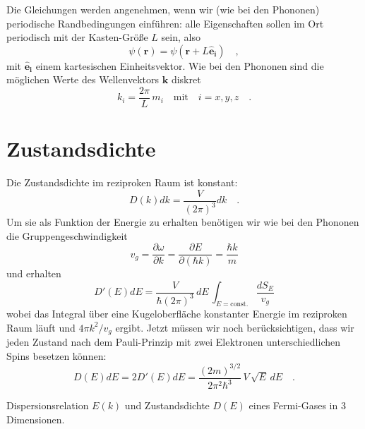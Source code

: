 Die Gleichungen werden angenehmen, wenn wir (wie bei den Phononen) periodische Randbedingungen einführen: alle Eigenschaften sollen im Ort periodisch mit der Kasten-Größe $L$ sein, also 
\begin{equation}
    \psi(\mathbf{r}) =  \psi(\mathbf{r} + L \mathbf{\hat{e}_i}) \quad ,
\end{equation}
mit $\mathbf{\hat{e}_i}$ einem kartesischen Einheitsvektor.
Wie bei den Phononen sind die möglichen Werte des Wellenvektors  $\mathbf{k}$ diskret
\begin{equation}
    k_i = \frac{2 \pi}{L} \, m_i \quad \text{mit} \quad i = x,y,z \quad . \label{eq:2:k_randbed} 
\end{equation}




\section*{Zustandsdichte}

Die Zustandsdichte im reziproken Raum ist konstant:
\begin{equation}
    D(k) dk = \frac{V}{(2 \pi)^3} dk \quad .
\end{equation}
Um sie als Funktion der Energie zu erhalten benötigen wir wie bei den Phononen die Gruppengeschwindigkeit 
\begin{equation}
    v_g = \frac{\partial \omega}{ \partial k} = \frac{\partial E}{\partial (\hbar k)} = \frac{\hbar k}{m}
\end{equation}
und erhalten 
\begin{equation}
    D'(E) dE = \frac{V}{\hbar (2 \pi)^3} \, dE \, \int_{E = \text{const.}} \frac{d S_E}{v_g}  
\end{equation}
wobei das Integral über eine Kugeloberfläche konstanter Energie im reziproken Raum läuft und $4 \pi k^2 / v_g$ ergibt.
Jetzt müssen wir noch berücksichtigen, dass wir jeden Zustand nach dem Pauli-Prinzip mit zwei Elektronen unterschiedlichen Spins besetzen können:
\begin{equation}
    D(E) dE = 2 D'(E) dE =  \frac{(2m)^{3/2}}{2 \pi^2 \hbar^3} \, V \,  \sqrt{E} \, dE \quad .
\end{equation}


\begin{marginfigure}
    \caption{Dispersionsrelation $E(k)$ und Zustandsdichte $D(E)$ eines Fermi-Gases in 3 Dimensionen.}
\end{marginfigure}



